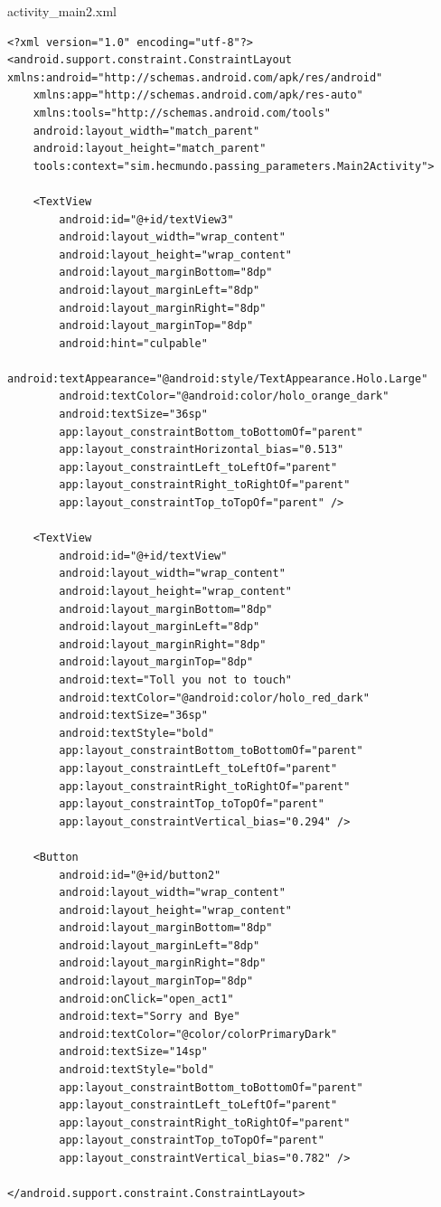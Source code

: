 \documentclass{report}
\begin{document}
activity\_main2.xml
\begin{lstlisting}
<?xml version="1.0" encoding="utf-8"?>
<android.support.constraint.ConstraintLayout xmlns:android="http://schemas.android.com/apk/res/android"
    xmlns:app="http://schemas.android.com/apk/res-auto"
    xmlns:tools="http://schemas.android.com/tools"
    android:layout_width="match_parent"
    android:layout_height="match_parent"
    tools:context="sim.hecmundo.passing_parameters.Main2Activity">

    <TextView
        android:id="@+id/textView3"
        android:layout_width="wrap_content"
        android:layout_height="wrap_content"
        android:layout_marginBottom="8dp"
        android:layout_marginLeft="8dp"
        android:layout_marginRight="8dp"
        android:layout_marginTop="8dp"
        android:hint="culpable"
        android:textAppearance="@android:style/TextAppearance.Holo.Large"
        android:textColor="@android:color/holo_orange_dark"
        android:textSize="36sp"
        app:layout_constraintBottom_toBottomOf="parent"
        app:layout_constraintHorizontal_bias="0.513"
        app:layout_constraintLeft_toLeftOf="parent"
        app:layout_constraintRight_toRightOf="parent"
        app:layout_constraintTop_toTopOf="parent" />

    <TextView
        android:id="@+id/textView"
        android:layout_width="wrap_content"
        android:layout_height="wrap_content"
        android:layout_marginBottom="8dp"
        android:layout_marginLeft="8dp"
        android:layout_marginRight="8dp"
        android:layout_marginTop="8dp"
        android:text="Toll you not to touch"
        android:textColor="@android:color/holo_red_dark"
        android:textSize="36sp"
        android:textStyle="bold"
        app:layout_constraintBottom_toBottomOf="parent"
        app:layout_constraintLeft_toLeftOf="parent"
        app:layout_constraintRight_toRightOf="parent"
        app:layout_constraintTop_toTopOf="parent"
        app:layout_constraintVertical_bias="0.294" />

    <Button
        android:id="@+id/button2"
        android:layout_width="wrap_content"
        android:layout_height="wrap_content"
        android:layout_marginBottom="8dp"
        android:layout_marginLeft="8dp"
        android:layout_marginRight="8dp"
        android:layout_marginTop="8dp"
        android:onClick="open_act1"
        android:text="Sorry and Bye"
        android:textColor="@color/colorPrimaryDark"
        android:textSize="14sp"
        android:textStyle="bold"
        app:layout_constraintBottom_toBottomOf="parent"
        app:layout_constraintLeft_toLeftOf="parent"
        app:layout_constraintRight_toRightOf="parent"
        app:layout_constraintTop_toTopOf="parent"
        app:layout_constraintVertical_bias="0.782" />

</android.support.constraint.ConstraintLayout>

\end{lstlisting}
\end{document}
